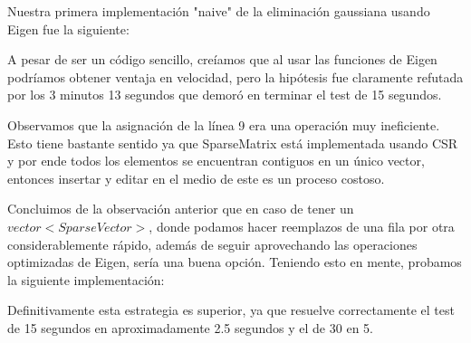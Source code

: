 Nuestra primera implementación "naive" de la eliminación gaussiana usando Eigen fue la siguiente:

\vspace{1em}


\vspace{1em}
A pesar de ser un código sencillo, creíamos que al usar las funciones de Eigen podríamos obtener ventaja en velocidad, pero la hipótesis fue claramente refutada por los 3 minutos 13 segundos que demoró en terminar el test de 15 segundos.

\vspace{1em}
Observamos que la asignación de la línea 9 era una operación muy ineficiente. Esto tiene bastante sentido ya que SparseMatrix está implementada usando CSR y por ende todos los elementos se encuentran contiguos en un único vector, entonces insertar y editar en el medio de este es un proceso costoso.
 
\vspace{1em}
Concluimos de la observación anterior que en caso de tener un $vector<SparseVector>$, donde podamos hacer reemplazos de una fila por otra considerablemente rápido, además de seguir aprovechando las operaciones optimizadas de Eigen, sería una buena opción. Teniendo esto en mente, probamos la siguiente implementación:

\vspace{1em}


\vspace{1em}
Definitivamente esta estrategia es superior, ya que resuelve correctamente el test de 15 segundos en aproximadamente 2.5 segundos y el de 30 en 5.


% 

